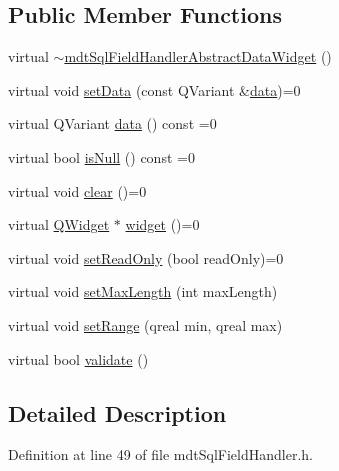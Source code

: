 \subsection*{Public Member Functions}
\begin{DoxyCompactItemize}
\item 
virtual \hyperlink{classmdt_sql_field_handler_abstract_data_widget_a063503e3a081f5ead335407b7da85bbf}{$\sim$mdt\-Sql\-Field\-Handler\-Abstract\-Data\-Widget} ()
\item 
virtual void \hyperlink{classmdt_sql_field_handler_abstract_data_widget_a5d9e6c6bfa923f07598179c71c88ba4b}{set\-Data} (const Q\-Variant \&\hyperlink{classmdt_sql_field_handler_abstract_data_widget_a90f1259501179fc28cd46bdf9c5f7d55}{data})=0
\item 
virtual Q\-Variant \hyperlink{classmdt_sql_field_handler_abstract_data_widget_a90f1259501179fc28cd46bdf9c5f7d55}{data} () const =0
\item 
virtual bool \hyperlink{classmdt_sql_field_handler_abstract_data_widget_a077d5b1b9a0cb592be9def99cdc6ad3a}{is\-Null} () const =0
\item 
virtual void \hyperlink{classmdt_sql_field_handler_abstract_data_widget_a54c1bc177f2a5f06d29ce24a801b6b3e}{clear} ()=0
\item 
virtual \hyperlink{class_q_widget}{Q\-Widget} $\ast$ \hyperlink{classmdt_sql_field_handler_abstract_data_widget_a460c76d650eba635ffb42951c7adbb50}{widget} ()=0
\item 
virtual void \hyperlink{classmdt_sql_field_handler_abstract_data_widget_a5d358ea305c375309c83be572dae2562}{set\-Read\-Only} (bool read\-Only)=0
\item 
virtual void \hyperlink{classmdt_sql_field_handler_abstract_data_widget_a7167463d910f13cff681668b4bc0e139}{set\-Max\-Length} (int max\-Length)
\item 
virtual void \hyperlink{classmdt_sql_field_handler_abstract_data_widget_a1c391f7af13f1a451354273352934801}{set\-Range} (qreal min, qreal max)
\item 
virtual bool \hyperlink{classmdt_sql_field_handler_abstract_data_widget_a24bd1c151df4e137b2b73322a6da0673}{validate} ()
\end{DoxyCompactItemize}


\subsection{Detailed Description}


Definition at line 49 of file mdt\-Sql\-Field\-Handler.\-h.



